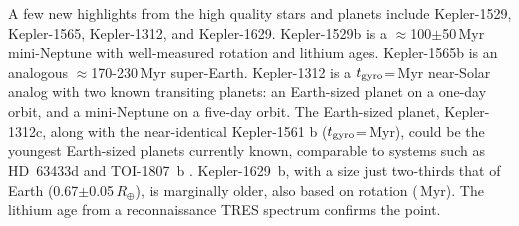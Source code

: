 \documentclass[11pt,twocolumn,tighten]{aastex63}
\begin{document}
A few new highlights from the high quality stars and planets include
Kepler-1529, Kepler-1565, Kepler-1312, and Kepler-1629.
Kepler-1529b is a $\approx$100$\pm$50\,Myr mini-Neptune with well-measured
rotation and lithium ages.
Kepler-1565b is an analogous $\approx$170-230\,Myr super-Earth.
Kepler-1312 is a $t_{\rm gyro}$=\kepthirteentwelve\,Myr near-Solar analog with
two known transiting planets: an Earth-sized planet on a one-day orbit,
and a mini-Neptune on a five-day orbit.
The Earth-sized planet, Kepler-1312c, along with the near-identical
Kepler-1561 b ($t_{\rm gyro}$=\kepfifteensixone\,Myr), 
could be the
youngest Earth-sized planets currently known, comparable to systems
such as HD~63433d \citep[1.1\,$R_\oplus$,
$414$$\pm$$23$\,Myr;][]{2024AJ....167...54C} and TOI-1807~b \citep[1.3\,$R_\oplus$, 180$\pm$40\,Myr;][]{2021AJ....162...54H}.
Kepler-1629~b, with a size just two-thirds that of Earth
(0.67$\pm$0.05\,$R_\oplus$), is marginally older, also based on rotation
(\kepsixteentwonine\,Myr).  The lithium age from a reconnaissance 
TRES spectrum confirms the point.






\end{document}
